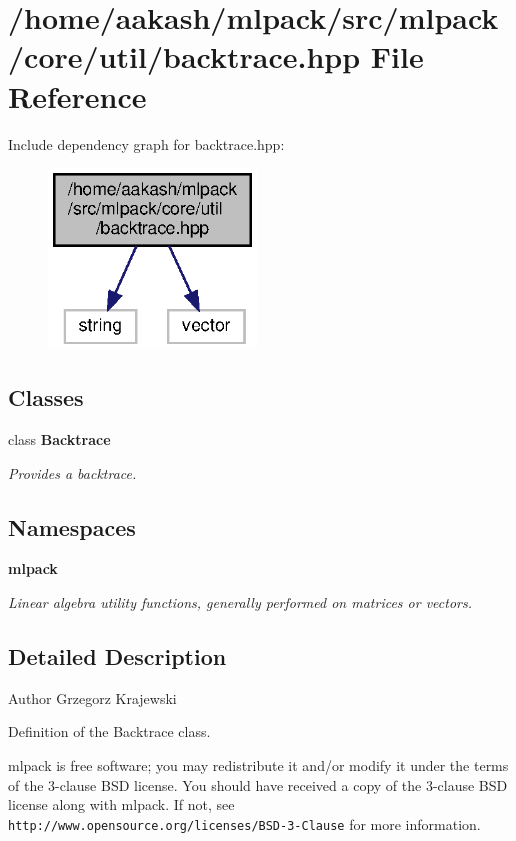 \section{/home/aakash/mlpack/src/mlpack/core/util/backtrace.hpp File Reference}
\label{backtrace_8hpp}
Include dependency graph for backtrace.\+hpp\+:
\nopagebreak
\begin{figure}[H]
\begin{center}
\leavevmode
\includegraphics[width=157pt]{backtrace_8hpp__incl}
\end{center}
\end{figure}
\subsection*{Classes}
\begin{DoxyCompactItemize}
\item 
class \textbf{ Backtrace}
\begin{DoxyCompactList}\small\item\em Provides a backtrace. \end{DoxyCompactList}\end{DoxyCompactItemize}
\subsection*{Namespaces}
\begin{DoxyCompactItemize}
\item 
 \textbf{ mlpack}
\begin{DoxyCompactList}\small\item\em Linear algebra utility functions, generally performed on matrices or vectors. \end{DoxyCompactList}\end{DoxyCompactItemize}


\subsection{Detailed Description}
\begin{DoxyAuthor}{Author}
Grzegorz Krajewski
\end{DoxyAuthor}
Definition of the Backtrace class.

mlpack is free software; you may redistribute it and/or modify it under the terms of the 3-\/clause B\+SD license. You should have received a copy of the 3-\/clause B\+SD license along with mlpack. If not, see {\tt http\+://www.\+opensource.\+org/licenses/\+B\+S\+D-\/3-\/\+Clause} for more information. 